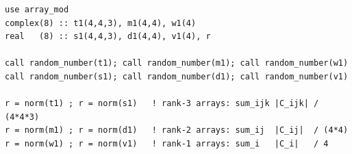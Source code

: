 \begin{description}[leftmargin=2.2cm, style=nextline]
\end{description}

\lstset{language=[95]Fortran}
\begin{lstlisting}
use array_mod
complex(8) :: t1(4,4,3), m1(4,4), w1(4)
real   (8) :: s1(4,4,3), d1(4,4), v1(4), r

call random_number(t1); call random_number(m1); call random_number(w1)
call random_number(s1); call random_number(d1); call random_number(v1)

r = norm(t1) ; r = norm(s1)   ! rank-3 arrays: sum_ijk |C_ijk| / (4*4*3)
r = norm(m1) ; r = norm(d1)   ! rank-2 arrays: sum_ij  |C_ij|  / (4*4)
r = norm(w1) ; r = norm(v1)   ! rank-1 arrays: sum_i   |C_i|   / 4
\end{lstlisting}
